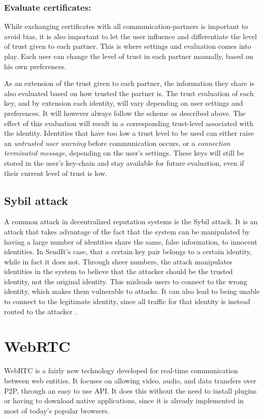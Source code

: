         \subsubsection*{Evaluate certificates:}
        While exchanging certificates with all communication-partners is important to avoid bias, it is also important to let the user influence and differentiate the level of trust given to each partner. This is where settings and evaluation comes into play. Each user can change the level of trust in each partner manually, based on his own preferences.

        As an extension of the trust given to each partner, the information they share is also evaluated based on how trusted the partner is. The trust evaluation of each key, and by extension each identity, will vary depending on user settings and preferences. It will however always follow the scheme as described above. The effect of this evaluation will result in a corresponding trust-level associated with the identity. Identities that have too low a trust level to be used can either raise an \emph{untrusted user warning} before communication occurs, or a \emph{connection terminated message}, depending on the user's settings. These keys will still be stored in the user's key-chain and stay available for future evaluation, even if their current level of trust is low.

    \subsection{Sybil attack}
    \label{sec:trust_syb}
    A common attack in decentralized reputation systems is the Sybil attack. It is an attack that takes advantage of the fact that the system can be manipulated by having a large number of identities share the same, false information, to innocent identities. In SendIt's case, that a certain key pair belongs to a certain identity, while in fact it does not. Through sheer numbers, the attack manipulates identities in the system to believe that the attacker should be the trusted identity, not the original identity. This misleads users to connect to the wrong identity, which makes them vulnerable to attacks. It can also lead to being unable to connect to the legitimate identity, since all traffic for that identity is instead routed to the attacker \cite{lncs_sybil}.

%
\section{WebRTC}
\label{sec:webrtc}
%
    WebRTC is a fairly new technology developed for real-time communication between web entities. It focuses on allowing video, audio, and data transfers over P2P, through an easy to use API. It does this without the need to install plugins or having to download native applications, since it is already implemented in most of today's popular browsers. 

